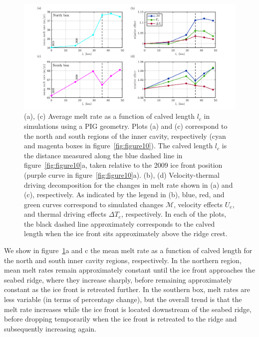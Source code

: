 \documentclass[draft]{agujournal2019}
\begin{document}
\begin{figure}
    \centering
    \includegraphics[width = \textwidth]{../make_figures/plots/figure13.png}
    \caption{(a), (c) Average melt rate as a function of calved length $l_c$ in simulations using a PIG geometry. Plots (a) and (c) correspond to the north and south regions of the inner cavity, respectively (cyan and magenta boxes in figure~\ref{fig:figure10}). The calved length $l_c$ is the distance measured along the blue dashed line in figure~\ref{fig:figure10}a, taken relative to the 2009 ice front position (purple curve in figure~\ref{fig:figure10}a). (b), (d) Velocity-thermal driving decomposition for the changes in melt rate shown in (a) and (c), respectively. As indicated by the legend in (b), blue, red, and green curves correspond to simulated changes $\mathcal{M}$, velocity effects $U_e$, and thermal driving effects $\Delta T_e$, respectively. In each of the plots, the black dashed line approximately corresponds to the calved length when the ice front sits approximately above the ridge crest.}\label{fig:figure13}
\end{figure}

We show in figure~\ref{fig:figure13}a and c the mean melt rate as a function of calved length for the north and south inner cavity regions, respectively. In the northern region, mean melt rates remain approximately constant until the ice front approaches the seabed ridge, where they increase sharply, before remaining approximately constant as the ice front is retreated further. In the southern box, melt rates are less variable (in terms of percentage change), but the overall trend is that the melt rate increases while the ice front is located downstream of the seabed ridge, before dropping temporarily when the ice front is retreated to the ridge and subsequently increasing again.
\end{document}
